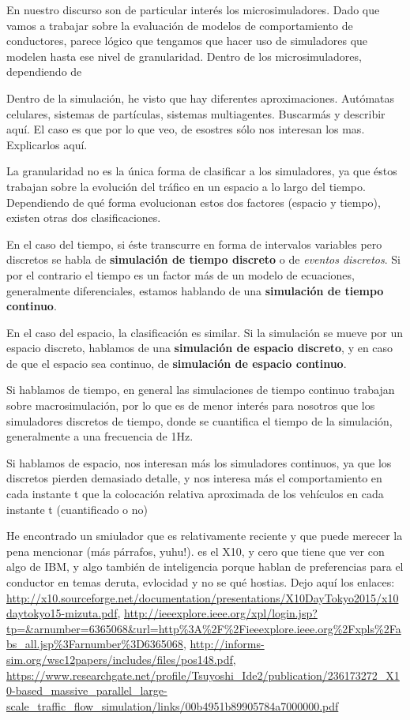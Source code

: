 En nuestro discurso son de particular interés los microsimuladores. Dado que vamos a trabajar sobre la evaluación de modelos de comportamiento de conductores, parece lógico que tengamos que hacer uso de simuladores que modelen hasta ese nivel de granularidad. Dentro de los microsimuladores, dependiendo de 

Dentro de la simulación, he visto que hay diferentes aproximaciones. Autómatas celulares, sistemas de partículas, sistemas multiagentes. Buscarmás y describir aquí. El caso es que por lo que veo, de esostres sólo nos interesan los mas. Explicarlos aquí.

La granularidad no es la única forma de clasificar a los simuladores, ya que éstos trabajan sobre la evolución del tráfico en un espacio a lo largo del tiempo. Dependiendo de qué forma evolucionan estos dos factores (espacio y tiempo), existen otras dos clasificaciones.

En el caso del tiempo, si éste transcurre en forma de intervalos variables pero discretos se habla de \textbf{simulación de tiempo discreto} o de \textit{eventos discretos}. Si por el contrario el tiempo es un factor más de un modelo de ecuaciones, generalmente diferenciales, estamos hablando de una \textbf{simulación de tiempo continuo}.

En el caso del espacio, la clasificación es similar. Si la simulación se mueve por un espacio discreto, hablamos de una \textbf{simulación de espacio discreto}, y en caso de que el espacio sea continuo, de \textbf{simulación de espacio continuo}. 

Si hablamos de tiempo, en general las simulaciones de tiempo continuo trabajan sobre macrosimulación, por lo que es de menor interés para nosotros que los simuladores discretos de tiempo, donde se cuantifica el tiempo de la simulación, generalmente a una frecuencia de 1Hz.

Si hablamos de espacio, nos interesan más los simuladores continuos, ya que los discretos pierden demasiado detalle, y nos interesa más el comportamiento en cada instante t que la colocación relativa aproximada de los vehículos en cada instante t (cuantificado o no)

He encontrado un smiulador que es relativamente reciente y que puede merecer la pena mencionar (más párrafos, yuhu!). es el X10, y cero que tiene que ver con algo de IBM, y algo también de inteligencia porque hablan de preferencias para el conductor en temas deruta, evlocidad y no se qué hostias. Dejo aquí los enlaces: \url{http://x10.sourceforge.net/documentation/presentations/X10DayTokyo2015/x10daytokyo15-mizuta.pdf}, \url{http://ieeexplore.ieee.org/xpl/login.jsp?tp=\&arnumber=6365068\&url=http\%3A\%2F\%2Fieeexplore.ieee.org\%2Fxpls\%2Fabs\_all.jsp\%3Farnumber\%3D6365068}, \url{http://informs-sim.org/wsc12papers/includes/files/pos148.pdf}, \url{https://www.researchgate.net/profile/Tsuyoshi\_Ide2/publication/236173272\_X10-based\_massive\_parallel\_large-scale\_traffic\_flow\_simulation/links/00b4951b89905784a7000000.pdf}

